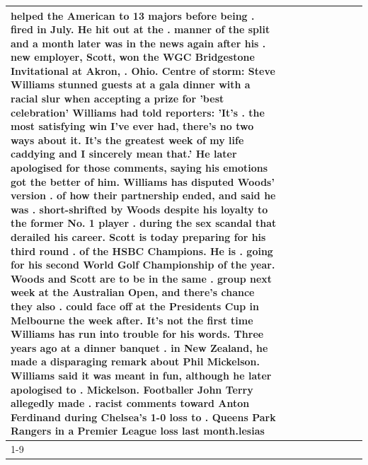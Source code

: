 \begin{table}[H]
\begin{tabular}{lllrlllll}
helped the American to 13 majors before being . fired in July. He hit out at the . manner of the split and a month later was in the news again after his . new employer, Scott, won the WGC Bridgestone Invitational at Akron, . Ohio. Centre of storm: Steve Williams stunned guests at a gala dinner with a racial slur when accepting a prize for 'best celebration' Williams had told reporters: 'It's . the most satisfying win I've ever had, there's no two ways about it. It's the greatest week of my life caddying and I sincerely mean that.' He later apologised for those comments, saying his emotions got the better of him. Williams has disputed Woods' version . of how their partnership ended, and said he was . short-shrifted by Woods despite his loyalty to the former No. 1 player . during the sex scandal that derailed his career. Scott is today preparing for his third round . of the HSBC Champions. He is . going for his second World Golf Championship of the year. Woods and Scott are to be in the same . group next week at the Australian Open, and there's chance they also . could face off at the Presidents Cup in Melbourne the week after. It's not the first time Williams has run into trouble for his words. Three years ago at a dinner banquet . in New Zealand, he made a disparaging remark about Phil Mickelson. Williams said it was meant in fun, although he later apologised to . Mickelson. Footballer John Terry allegedly made . racist comments toward Anton Ferdinand during Chelsea's 1-0 loss to . Queens Park Rangers in a Premier League loss last month.lesias \\
\cline{1-9}

\end{tabular}
\end{table}

